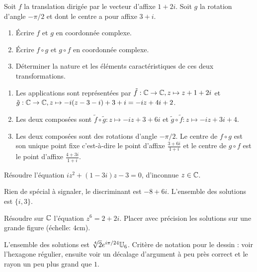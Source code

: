\begin{exo}
Soit $f$ la translation dirigée par le vecteur d'affixe $1+2i$. Soit $g$ la rotation d'angle $-\pi/2$ et dont le centre a pour affixe $3+i$.
\begin{enumerate}
\item Écrire $f$ et $g$ en coordonnée complexe.
\item Écrire $f\circ g$ et $g\circ f$ en coordonnée complexe.
\item Déterminer la nature et les éléments caractéristiques de ces deux transformations.
\end{enumerate}
\begin{sol}
\begin{enumerate}
\item Les applications sont représentées par $\tilde f : \mathbb{C}\to \mathbb{C}, z\mapsto z+1+2i$ et $\tilde g : \mathbb{C}\to \mathbb{C}, z\mapsto -i(z-3-i)+3+i=-iz+4i+2$.
\item Les deux composées sont $\tilde f \circ \tilde g : z\mapsto -iz+3+6i$ et $\tilde g\circ \tilde f : z\mapsto -iz+3i+4$.
\item Les deux composées sont des rotations d'angle $-\pi/2$. Le centre de $f\circ g$ est son unique point fixe c'est-à-dire le point d'affixe $\frac{3+6i}{1+i}$ et le centre de $g\circ f$ est le point d'affixe $\frac{4+3i}{1+i}$.
\end{enumerate}
\end{sol}
\end{exo}



\begin{exo}%
Résoudre l'équation $iz^2+(1-3i)z-3=0$, d'inconnue $z\in \mathbb{C}$.
\begin{sol}
Rien de spécial à signaler, le discriminant est $-8+6i$. L'ensemble des solutions est $\{i,3\}$.
\end{sol}
\end{exo}

\begin{exo}
Résoudre sur $\mathbb{C}$ l'équation $z^6=2+2i$. Placer avec précision les solutions sur une grande figure (échelle: 4cm).
\begin{sol}
L'ensemble des solutions est $\sqrt[4]{2}e^{i\pi/24}\mathbb{U}_6$. Critère de notation pour le dessin : voir l'hexagone régulier, ensuite voir un décalage d'argument à peu près correct et le rayon un peu plus grand que $1$.
\end{sol}
\end{exo}



